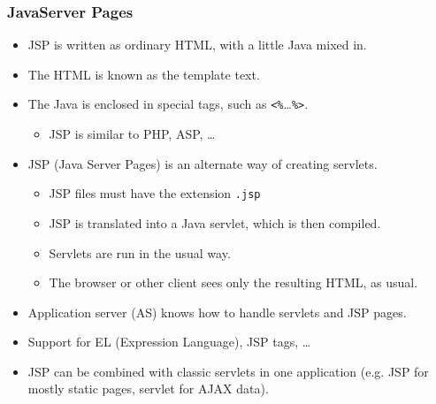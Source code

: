 \documentclass[10pt,xcolor=pdflatex]{beamer}
\begin{document}
\begin{frame}[containsverbatim]\frametitle{JavaServer Pages}
	\begin{itemize}
        \item JSP is written as ordinary HTML, with a little Java mixed in.
        \item The HTML is known as the template text.
	    \item The Java is enclosed in special tags, such as \verb;<%;\ldots \texttt{\%>}.
          \begin{itemize}
            \item JSP is similar to PHP, ASP, \ldots
          \end{itemize}
    	\item JSP (Java Server Pages) is an alternate way of creating servlets.
            \begin{itemize}
                \item JSP files must have the extension \texttt{.jsp}
				\item JSP is translated into a Java servlet, which is then compiled.
				\item Servlets are run in the usual way.
				\item The browser or other client sees only the resulting HTML, as usual.
            \end{itemize}
        \item Application server (AS) knows how to handle servlets and JSP pages.
		\item Support for EL (Expression Language), JSP tags, \ldots
        \item JSP can be combined with classic servlets in one application (e.g. JSP for mostly static pages, servlet for AJAX data).
    \end{itemize}
\end{frame}
\end{document}
